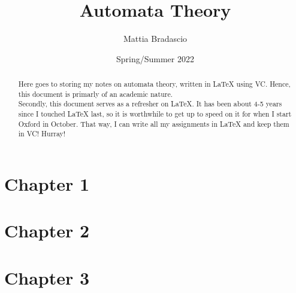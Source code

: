 \documentclass[12pt, letterpaper]{article}
\title{Automata Theory}
\author{Mattia Bradascio}
\date{Spring/Summer 2022}
\begin{document}
\begin{titlepage}
\maketitle
\end{titlepage}

\begin{abstract}

    Here goes to storing my notes on automata theory, written in LaTeX using VC.
    Hence, this document is primarly of an academic nature. \\ 
    \indent Secondly, this document serves as a refresher on LaTeX. 
    It has been about 4-5 years since I touched LaTeX last, so it is 
    worthwhile to get up to speed on it for when I start Oxford in October.
    That way, I can write all my assignments in LaTeX and keep them in VC! Hurray! \\

\end{abstract}

\section{Chapter 1}


\section{Chapter 2}


\section{Chapter 3}

\end{document}
